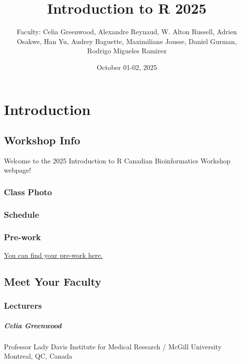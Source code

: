 \documentclass[
]{book}
\title{Introduction to R 2025}
\author{Faculty: Celia Greenwood, Alexandre Reynaud, W. Alton Russell, Adrien Osakwe, Han Yu, Audrey Baguette, Maximiliane Jousse, Daniel Gurman, Rodrigo Migueles Ramirez}
\date{October 01-02, 2025}
\begin{document}
\maketitle

{
\setcounter{tocdepth}{1}
\tableofcontents
}
\part{Introduction}\label{part-introduction}

\chapter{Workshop Info}\label{workshop-info}

Welcome to the 2025 Introduction to R Canadian Bioinformatics Workshop webpage!

\section{Class Photo}\label{class-photo}

\section{Schedule}\label{schedule}

\section{Pre-work}\label{pre-work}

\href{https://docs.google.com/forms/d/e/1FAIpQLSdqzz503MPixGxHCbMSvXJCsZyQ8yWG9g1NIO2SexwJL9JUzw/viewform?usp=share_link&ouid=101140812887781190012}{You can find your pre-work here.}

\chapter{Meet Your Faculty}\label{meet-your-faculty}

\section{Lecturers}\label{lecturers}

\subsubsection{Celia Greenwood}\label{celia-greenwood}

Professor
Lady Davis Institute for Medical Research / McGill University
Montreal, QC, Canada
\end{document}
